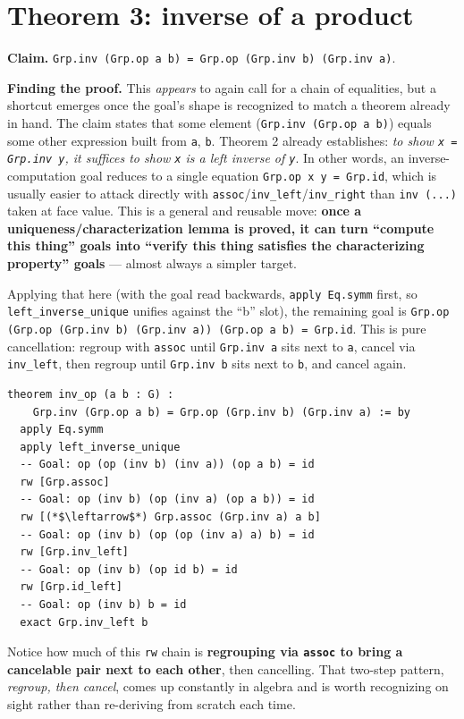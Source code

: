 \section{Theorem 3: inverse of a product}\label{sec:07-group-theorems:04-theorem-3:1}

\textbf{Claim.} \texttt{Grp.inv (Grp.op a b) = Grp.op (Grp.inv b) (Grp.inv a)}.

\textbf{Finding the proof.} This \emph{appears} to again call for a chain of equalities, but a shortcut emerges once the goal's shape is recognized to match a theorem already in hand. The claim states that some element (\texttt{Grp.inv (Grp.op a b)}) equals some other expression built from \texttt{a}, \texttt{b}. Theorem 2 already establishes: \emph{to show \texttt{x = Grp.inv y}, it suffices to show \texttt{x} is a left inverse of \texttt{y}}. In other words, an inverse-computation goal reduces to a single equation \texttt{Grp.op x y = Grp.id}, which is usually easier to attack directly with \texttt{assoc}/\texttt{inv\_\allowbreak{}left}/\texttt{inv\_\allowbreak{}right} than \texttt{inv (...)} taken at face value. This is a general and reusable move: \textbf{once a uniqueness/characterization lemma is proved, it can turn ``compute this thing'' goals into ``verify this thing satisfies the characterizing property'' goals} --- almost always a simpler target.

Applying that here (with the goal read backwards, \texttt{apply Eq.symm} first, so \texttt{left\_\allowbreak{}inverse\_\allowbreak{}unique} unifies against the ``b'' slot), the remaining goal is \texttt{Grp.op (Grp.op (Grp.inv b) (Grp.inv a)) (Grp.op a b) = Grp.id}. This is pure cancellation: regroup with \texttt{assoc} until \texttt{Grp.inv a} sits next to \texttt{a}, cancel via \texttt{inv\_\allowbreak{}left}, then regroup until \texttt{Grp.inv b} sits next to \texttt{b}, and cancel again.

\begin{lstlisting}
theorem inv_op (a b : G) :
    Grp.inv (Grp.op a b) = Grp.op (Grp.inv b) (Grp.inv a) := by
  apply Eq.symm
  apply left_inverse_unique
  -- Goal: op (op (inv b) (inv a)) (op a b) = id
  rw [Grp.assoc]
  -- Goal: op (inv b) (op (inv a) (op a b)) = id
  rw [(*$\leftarrow$*) Grp.assoc (Grp.inv a) a b]
  -- Goal: op (inv b) (op (op (inv a) a) b) = id
  rw [Grp.inv_left]
  -- Goal: op (inv b) (op id b) = id
  rw [Grp.id_left]
  -- Goal: op (inv b) b = id
  exact Grp.inv_left b
\end{lstlisting}

Notice how much of this \texttt{rw} chain is \textbf{regrouping via \texttt{assoc} to bring a cancelable pair next to each other}, then cancelling. That two-step pattern, \emph{regroup, then cancel}, comes up constantly in algebra and is worth recognizing on sight rather than re-deriving from scratch each time.

